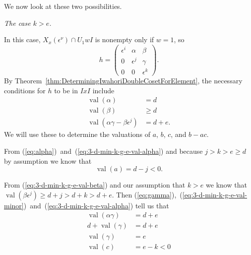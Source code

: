 \documentclass{amsart}
\theoremstyle{definition}
\def\e{\epsilon}
\def\val{\mathop{\mathrm{val}}}
\def\en{\e^{\nu}}
\def\X{X_x(\en)}
\newcommand\subsubsubsection[1]{\vspace{0.5em}\begin{paragraph}{}\noindent \normalfont\large\itshape #1. \end{paragraph}\vspace{0.5em}}
\begin{document}
  We now look at these two possibilities.

  \subsubsubsection{The case $k > e$}
  
  In this case, $\X \cap U_1wI$ is nonempty only if $w = 1$, so
  \begin{equation*}
    h = \begin{pmatrix}
      \e^i & \alpha & \beta \\
      0 & \e^j & \gamma \\
      0 & 0 & \e^k
    \end{pmatrix}.
  \end{equation*}
  By Theorem~\ref{thm:DeterminingIwahoriDoubleCosetForElement}, the necessary
  conditions for $h$ to be in $IxI$ include
  \begin{align}
    \label{eq:3-d-min-k-g-e-val-alpha}
    \val(\alpha) &= d \\
    \label{eq:3-d-min-k-g-e-val-beta}
    \val(\beta) &\ge d \\
    \label{eq:3-d-min-k-g-e-val-minor}
    \val(\alpha\gamma - \beta\e^j) &= d + e.
  \end{align}
  We will use these to determine the valuations of $a$, $b$, $c$, and $b -
  ac$.

  From (\ref{eq:alpha})~and~(\ref{eq:3-d-min-k-g-e-val-alpha}) and because $j > k
  > e \ge d$ by assumption we know that
  \begin{equation}
    \label{eq:3-d-min-k-g-e-val-a}
    \val(a) = d - j < 0.
  \end{equation}

  From (\ref{eq:3-d-min-k-g-e-val-beta}) and our assumption that $k > e$ we
  know that $\val(\beta\e^j) \ge d + j > d + k > d + e$.  Then
  (\ref{eq:gamma}),~(\ref{eq:3-d-min-k-g-e-val-minor})~and~(\ref{eq:3-d-min-k-g-e-val-alpha})
  tell us that
  \begin{align}
    \val(\alpha\gamma) &= d + e \nonumber\\
    d + \val(\gamma) &= d + e \nonumber \\
    \val(\gamma) &= e \nonumber \\
    \label{eq:3-d-min-k-g-e-val-c}
    \val(c) &= e - k < 0
  \end{align}
\end{document}
